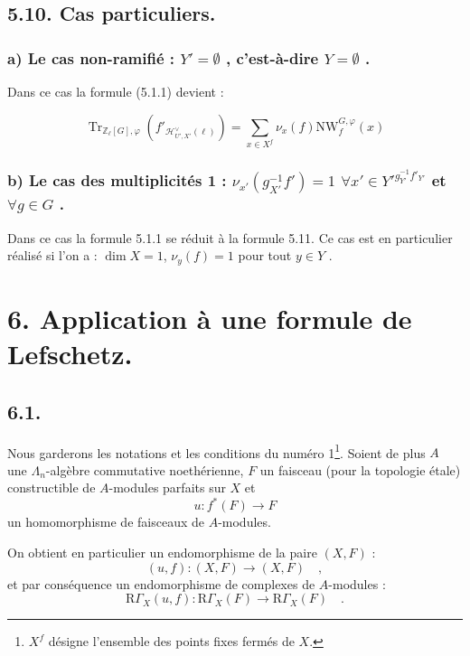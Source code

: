 \documentclass[11pt]{article}
\newcommand{\R}{\mathrm{R}}\newcommand{\RHomCore}{\mathrm{RHom}}
\providecommand{\Tr}{\operatorname{Tr}}
\providecommand{\Tr}{\operatorname{Tr}}
\providecommand{\Tr}{\operatorname{Tr}}
\providecommand{\R}{\mathrm R}
\providecommand{\Tr}{\operatorname{Tr}}
\providecommand{\La}{\Lambda}
\providecommand{\bZ}{\mathbb Z}
\providecommand{\Tr}{\operatorname{Tr}}
\begin{document}
\subsection*{5.10. Cas particuliers.}
\subsubsection*{a) Le cas non-ramifié : $Y' = \emptyset$ , c'est-à-dire $Y = \emptyset$ .}

Dans ce cas la formule (5.1.1) devient :

\begin{equation}\tag{5.11}
\Tr_{\bZ_\ell[G],\varphi}(f'_{\mathcal{H}^\vee_{U',X'}(\ell)}) = \sum_{x \in X^f} \nu_x(f) \mathrm{NW}_f^{G,\varphi}(x)
\end{equation}

\subsubsection*{b) Le cas des multiplicités 1 : $\nu_{x'}(g_{X'}^{-1}f') = 1$ $\forall x'\in {Y'}^{g_{Y'}^{-1}f'_{Y'}}$ et $\forall g\in G$ .}

Dans ce cas la formule 5.1.1 se réduit à la formule 5.11. Ce cas est en particulier réalisé si l'on a : $\dim X = 1$, $\nu_y(f)=1$ pour tout $y\in Y$ .%

\section*{6. Application à une formule de Lefschetz.}

\subsection*{6.1.}
Nous garderons les notations et les conditions du numéro 1\footnote{$X^f$ désigne l'ensemble des points fixes fermés de $X$.}. Soient de plus $A$ une $\La_n$-algèbre commutative noethérienne, $F$ un faisceau (pour la topologie étale) constructible de $A$-modules parfaits sur $X$ et
\[
u : f^*(F) \longrightarrow F
\]
un homomorphisme de faisceaux de $A$-modules.

On obtient en particulier un endomorphisme de la paire $(X, F)$ :
\[
(u, f) : (X, F) \longrightarrow (X, F) \quad ,
\]
et par conséquence un endomorphisme de complexes de $A$-modules :
\[
\R\Gamma_X(u, f) : \R\Gamma_X(F) \longrightarrow \R\Gamma_X(F) \quad .
\]
\end{document}
